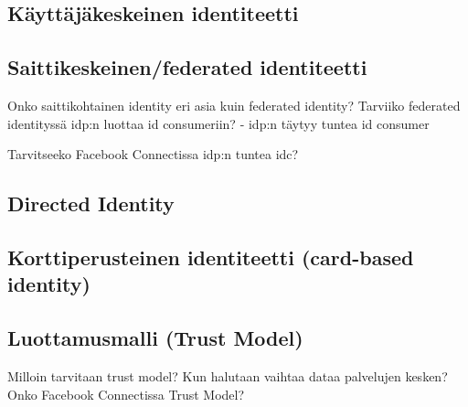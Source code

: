 \documentclass[finnish,gradu]{tktltiki}
\begin{document}
  \subsection{Käyttäjäkeskeinen identiteetti} %
  \label{sub:käyttäjäkeskeinen_identiteetti}


  \subsection{Saittikeskeinen/federated identiteetti} %
  \label{sub:saittikeskeinen_identiteetti}
  Onko saittikohtainen identity eri asia kuin federated identity?
  Tarviiko federated identityssä idp:n luottaa id consumeriin?
  - idp:n täytyy tuntea id consumer

  Tarvitseeko Facebook Connectissa idp:n tuntea idc?



  \subsection{Directed Identity} %
  \label{sub:directed_identity}


  \subsection{Korttiperusteinen identiteetti (card-based identity)} %
  \label{sub:korttiperusteinen_identiteetti_card_based_identity_}

  \subsection{Luottamusmalli (Trust Model)} %
  \label{sub:luottamusmalli_trust_model_}
  Milloin tarvitaan trust model? Kun halutaan vaihtaa dataa palvelujen kesken? Onko Facebook Connectissa Trust Model?
\end{document}
